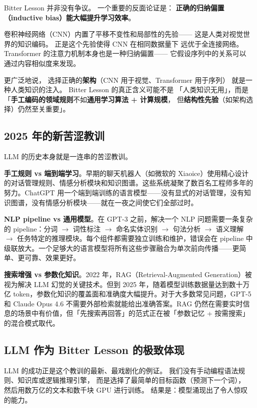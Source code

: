 Bitter Lesson 并非没有争议。
一个重要的反面论证是：
\textbf{正确的归纳偏置（inductive bias）能大幅提升学习效率}。

卷积神经网络（CNN）内置了平移不变性和局部性的先验——
这是人类对视觉世界的知识编码。
正是这个先验使得 CNN 在相同数据量下
远优于全连接网络。
Transformer 的注意力机制本身也是一种归纳偏置——
它假设序列中的关系可以通过内容相似度来发现。

更广泛地说，
选择正确的\textbf{架构}（CNN 用于视觉、Transformer 用于序列）
就是一种人类知识的注入。
Bitter Lesson 的真正含义可能不是
「人类知识无用」，而是
「\textbf{手工编码的领域规则}不如\textbf{通用学习算法 + 计算规模}，
但\textbf{结构性先验}（如架构选择）仍然至关重要」。

\subsection{2025 年的新苦涩教训}

LLM 的历史本身就是一连串的苦涩教训。

\textbf{手工规则 vs 端到端学习}。早期的聊天机器人（如微软的 Xiaoice）使用精心设计的对话管理规则、情感分析模块和知识图谱。这些系统凝聚了数百名工程师多年的努力。ChatGPT 用一个端到端训练的语言模型——没有显式的对话管理，没有知识图谱，没有情感分析模块——就在一夜之间使它们全部过时。

\textbf{NLP pipeline vs 通用模型}。在 GPT-3 之前，解决一个 NLP 问题需要一条复杂的 pipeline：分词 $\to$ 词性标注 $\to$ 命名实体识别 $\to$ 句法分析 $\to$ 语义理解 $\to$ 任务特定的推理模块。每个组件都需要独立训练和维护，错误会在 pipeline 中级联放大。一个足够大的语言模型将所有这些步骤融合为单次前向传播——更简单、更可靠、效果更好。

\textbf{搜索增强 vs 参数化知识}。2022 年，RAG（Retrieval-Augmented Generation）被视为解决 LLM 幻觉的关键技术。但到 2025 年，随着模型训练数据量达到数十万亿 token，参数化知识的覆盖面和准确度大幅提升。对于大多数常见问题，GPT-5 和 Claude Opus 4.6 不需要外部检索就能给出准确答案。RAG 仍然在需要实时信息的场景中有价值，但「先搜索再回答」的范式正在被「参数记忆 + 按需搜索」的混合模式取代。

\subsection{LLM 作为 Bitter Lesson 的极致体现}

LLM 的成功正是这个教训的最新、最戏剧化的例证。
我们没有手动编程语法规则、知识库或逻辑推理引擎，
而是选择了最简单的目标函数（预测下一个词），
然后用数万亿的文本和数千块 GPU 进行训练。
结果是：模型涌现出了令人惊叹的能力。

